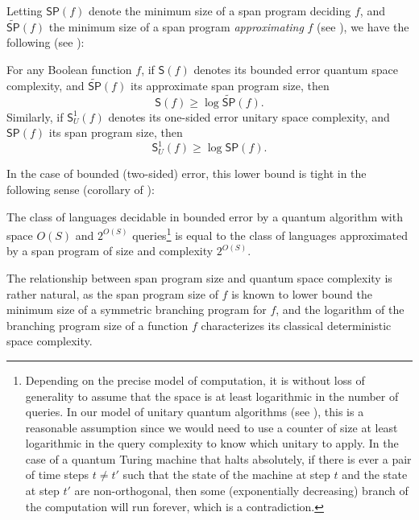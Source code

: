 \documentclass{toc}
\begin{document}
Letting $\mathsf{SP}(f)$ denote the minimum size of a span program deciding $f$, and $\widetilde{\mathsf{SP}}(f)$ the minimum size of a span program \emph{approximating} $f$ (see ), we have the following (see ):
\begin{theorem}[Informal]\label{thm:span-vs-space}
For any Boolean function $f$, if $\mathsf{S}(f)$ denotes its bounded error quantum space complexity, and $\widetilde{\mathsf{SP}}(f)$ its approximate span program size, then 
$$\mathsf{S}(f) \geq \log\widetilde{\mathsf{SP}}(f).$$
Similarly, if $\mathsf{S}_U^1(f)$ denotes its one-sided error unitary space complexity, and $\mathsf{SP}(f)$ its span program size, then 
$$\mathsf{S}_U^1(f)\geq \log\mathsf{SP}(f).$$
\end{theorem}
In the case of bounded (two-sided) error, this lower bound is tight in the following sense (corollary of ):
\begin{theorem}[Informal]\label{thm:span-vs-space-tight}
The class of languages decidable in bounded error by a quantum algorithm with space $O(S)$ and $2^{O(S)}$ queries\footnote{Depending on the precise model of computation, it is without loss of generality to assume that the space is at least logarithmic in the number of queries. In our model of unitary quantum algorithms (see ), this is a reasonable assumption since we would need to use a counter of size at least logarithmic in the query complexity to know which unitary to apply. In the case of a quantum Turing machine that halts absolutely, if there is ever a pair of time steps $t\neq t'$ such that the state of the machine at step $t$ and the state at step $t'$ are non-orthogonal, then some (exponentially decreasing) branch of the computation will run forever, which is a contradiction.} is equal to the class of languages approximated by a span program of size  and complexity $2^{O(S)}$.
\end{theorem}
The relationship between span program size and quantum space complexity is rather natural, as the span program size of $f$ is known to lower bound the minimum size of a symmetric branching program for $f$, and the logarithm of the branching program size of a function $f$ characterizes its classical deterministic space complexity. 
\end{document}
